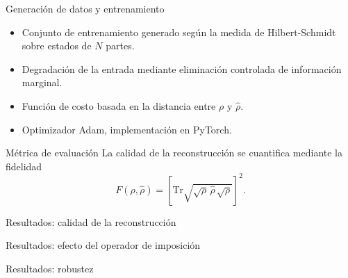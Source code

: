 \documentclass[10pt,aspectratio=169]{beamer}
\newcommand{\Tr}{\mathrm{Tr}}
\newcommand{\dens}{\rho}
\newcommand{\densh}{\hat{\rho}}
\begin{document}
\begin{frame}{Generación de datos y entrenamiento}
  \begin{itemize}
    \item Conjunto de entrenamiento generado según la medida de Hilbert-Schmidt sobre estados de $N$ partes.
    \item Degradación de la entrada mediante eliminación controlada de información marginal.
    \item Función de costo basada en la distancia entre $\dens$ y $\densh$.
    \item Optimizador Adam, implementación en PyTorch.
  \end{itemize}
  \vfill
  \pause
  \begin{block}{Métrica de evaluación}
    La calidad de la reconstrucción se cuantifica mediante la fidelidad
    \[
      F(\dens,\densh) = \left[\Tr\sqrt{\sqrt{\dens}\,\densh\,\sqrt{\dens}}\right]^2 .
    \]
  \end{block}
\end{frame}

\begin{frame}{Resultados: calidad de la reconstrucción}
  \begin{center}
  \end{center}
  \vfill
\end{frame}

\begin{frame}{Resultados: efecto del operador de imposición}
  \begin{center}
  \end{center}
  \vfill
\end{frame}

\begin{frame}{Resultados: robustez}
  \begin{center}
  \end{center}
\end{frame}
\end{document}
